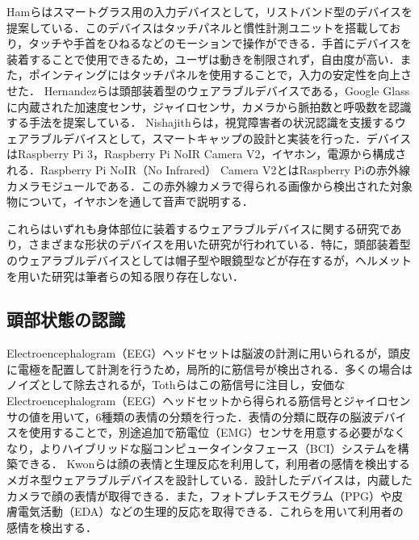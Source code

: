 \documentclass[Japanese,noauthor]{dicomopapers}
\begin{document}
Hamら\cite{smart_wristband}はスマートグラス用の入力デバイスとして，リストバンド型のデバイスを提案している．このデバイスはタッチパネルと慣性計測ユニットを搭載しており，タッチや手首をひねるなどのモーションで操作ができる．手首にデバイスを装着することで使用できるため，ユーザは動きを制限されず，自由度が高い．また，ポインティングにはタッチパネルを使用することで，入力の安定性を向上させた．
Hernandezら\cite{bioglass}は頭部装着型のウェアラブルデバイスである，Google Glassに内蔵された加速度センサ，ジャイロセンサ，カメラから脈拍数と呼吸数を認識する手法を提案している．
Nishajithら\cite{smart_cap}は，視覚障害者の状況認識を支援するウェアラブルデバイスとして，スマートキャップの設計と実装を行った．デバイスはRaspberry Pi 3，Raspberry Pi NoIR Camera V2，イヤホン，電源から構成される．Raspberry Pi NoIR（No Infrared） Camera V2とはRaspberry Piの赤外線カメラモジュールである．この赤外線カメラで得られる画像から検出された対象物について，イヤホンを通して音声で説明する．\par

これらはいずれも身体部位に装着するウェアラブルデバイスに関する研究であり，さまざまな形状のデバイスを用いた研究が行われている．特に，頭部装着型のウェアラブルデバイスとしては帽子型や眼鏡型などが存在するが，ヘルメットを用いた研究は筆者らの知る限り存在しない．

\subsection{頭部状態の認識}

Electroencephalogram（EEG）ヘッドセットは脳波の計測に用いられるが，頭皮に電極を配置して計測を行うため，局所的に筋信号が検出される．多くの場合はノイズとして除去されるが，Tothら\cite{facial_expression_headset}はこの筋信号に注目し，安価なElectroencephalogram（EEG）ヘッドセットから得られる筋信号とジャイロセンサの値を用いて，6種類の表情の分類を行った．表情の分類に既存の脳波デバイスを使用することで，別途追加で筋電位（EMG）センサを用意する必要がなくなり，よりハイブリッドな脳コンピュータインタフェース（BCI）システムを構築できる．
Kwonら\cite{facial_expression_glasses}は顔の表情と生理反応を利用して，利用者の感情を検出するメガネ型ウェアラブルデバイスを設計している．設計したデバイスは，内蔵したカメラで顔の表情が取得できる．また，フォトプレチスモグラム（PPG）や皮膚電気活動（EDA）などの生理的反応を取得できる．これらを用いて利用者の感情を検出する．\par
\end{document}
